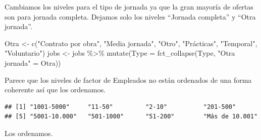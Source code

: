 \documentclass[
]{article}
\newenvironment{Shaded}{\begin{snugshade}}{\end{snugshade}}
\newcommand{\DataTypeTok}[1]{\textcolor[rgb]{0.87,0.87,0.75}{#1}}
\newcommand{\KeywordTok}[1]{\textcolor[rgb]{0.94,0.87,0.69}{#1}}
\newcommand{\NormalTok}[1]{\textcolor[rgb]{0.80,0.80,0.80}{#1}}
\newcommand{\OperatorTok}[1]{\textcolor[rgb]{0.94,0.94,0.82}{#1}}
\newcommand{\OtherTok}[1]{\textcolor[rgb]{0.94,0.94,0.56}{#1}}
\newcommand{\StringTok}[1]{\textcolor[rgb]{0.80,0.58,0.58}{#1}}
\begin{document}
Cambiamos los niveles para el tipo de jornada ya que la gran mayoría de
ofertas son para jornada completa. Dejamos solo los niveles ``Jornada
completa'' y ``Otra jornada''.

\begin{Shaded}
\begin{Highlighting}[]
\NormalTok{Otra \textless{}{-}}\StringTok{ }\KeywordTok{c}\NormalTok{(}\StringTok{"Contrato por obra"}\NormalTok{, }\StringTok{"Media jornada"}\NormalTok{, }\StringTok{"Otro"}\NormalTok{, }\StringTok{"Prácticas"}\NormalTok{, }\StringTok{"Temporal"}\NormalTok{, }\StringTok{"Voluntario"}\NormalTok{)}
\NormalTok{jobs \textless{}{-}}\StringTok{ }\NormalTok{jobs }\OperatorTok{\%\textgreater{}\%}
\StringTok{  }\KeywordTok{mutate}\NormalTok{(}\DataTypeTok{Type =} \KeywordTok{fct\_collapse}\NormalTok{(Type, }\StringTok{"Otra jornada"}\NormalTok{ =}\StringTok{ }\NormalTok{Otra))}
\end{Highlighting}
\end{Shaded}

Parece que los niveles de factor de Empleados no están ordenados de una
forma coherente así que los ordenamos.

\begin{Shaded}
\end{Shaded}

\begin{verbatim}
## [1] "1001-5000"     "11-50"         "2-10"          "201-500"      
## [5] "5001-10.000"   "501-1000"      "51-200"        "Más de 10.001"
\end{verbatim}

Los ordenamos.

\begin{Shaded}
\end{Shaded}
\end{document}
